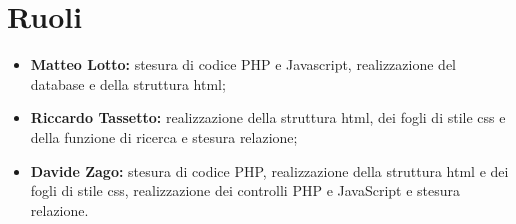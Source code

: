 \section{Ruoli}
\begin{itemize}
	\item \textbf{Matteo Lotto:} stesura di codice PHP e Javascript, realizzazione del database e della struttura html;
	\item \textbf{Riccardo Tassetto:} realizzazione della struttura html, dei fogli di stile css e della funzione di ricerca e stesura relazione;
	\item \textbf{Davide Zago:} stesura di codice PHP, realizzazione della struttura html e dei fogli di stile css, realizzazione dei controlli PHP e JavaScript e stesura relazione.
\end{itemize}